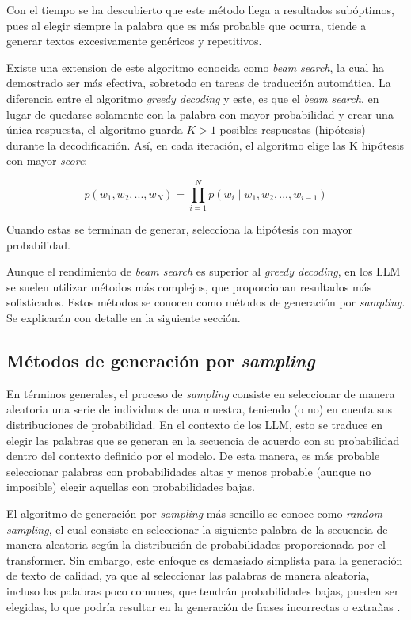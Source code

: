 \documentclass[11pt,spanish,listoffigures,listoftables]{tfgetsinf}
\begin{document}
Con el tiempo se ha descubierto que este método llega a resultados subóptimos, pues al elegir siempre la palabra que es más probable que ocurra, tiende a generar textos excesivamente genéricos y repetitivos.

Existe una extension de este algoritmo conocida como \textit{beam search}, la cual ha demostrado ser más efectiva, sobretodo en tareas de traducción automática. La diferencia entre el algoritmo \textit{greedy decoding} y este, es que el \textit{beam search}, en lugar de quedarse solamente con la palabra con mayor probabilidad y crear una única respuesta, el algoritmo guarda $K > 1$ posibles respuestas (hipótesis) durante la decodificación. Así, en cada iteración, el algoritmo elige las K hipótesis con mayor \textit{score}:

\begin{equation}
p(w_1, w_2, ..., w_N) = \prod_{i = 1}^{N} p(w_i \mid w_1, w_2, ..., w_{i-1})
\end{equation}

Cuando estas se terminan de generar, selecciona la hipótesis con mayor probabilidad.

Aunque el rendimiento de \textit{beam search} es superior al \textit{greedy decoding}, en los LLM se suelen utilizar métodos más complejos, que proporcionan resultados más sofisticados. Estos métodos se conocen como métodos de generación por \textit{sampling}. Se explicarán con detalle en la siguiente sección.

\subsection{Métodos de generación por \textit{sampling}}

En términos generales, el proceso de \textit{sampling} consiste en seleccionar de manera aleatoria una serie de individuos de una muestra, teniendo (o no) en cuenta sus distribuciones de probabilidad. En el contexto de los LLM, esto se traduce en elegir las palabras que se generan en la secuencia de acuerdo con su probabilidad dentro del contexto definido por el modelo. De esta manera, es más probable seleccionar palabras con probabilidades altas y menos probable (aunque no imposible) elegir aquellas con probabilidades bajas.

 El algoritmo de generación por \textit{sampling} más sencillo se conoce como \textit{random sampling}, el cual consiste en seleccionar la siguiente palabra de la secuencia de manera aleatoria según la distribución de probabilidades proporcionada por el transformer. Sin embargo, este enfoque es demasiado simplista para la generación de texto de calidad, ya que al seleccionar las palabras de manera aleatoria, incluso las palabras poco comunes, que tendrán probabilidades bajas, pueden ser elegidas, lo que podría resultar en la generación de frases incorrectas o extrañas \cite{jurafsky2023speech}.
\end{document}
